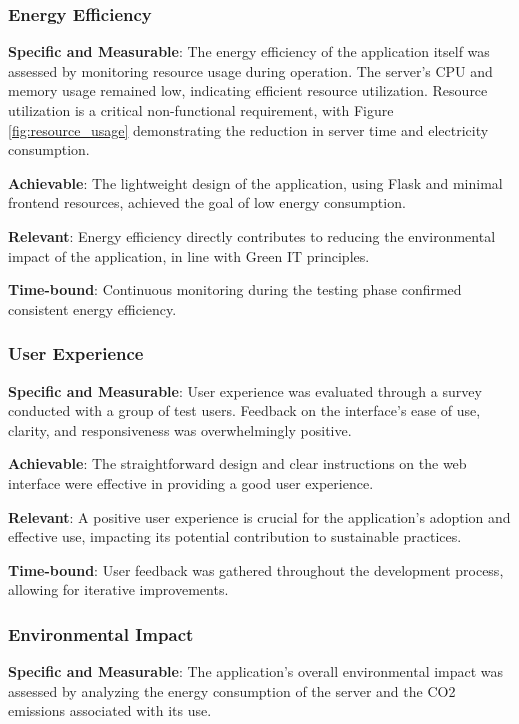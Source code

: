 \documentclass[conference,compsoc]{IEEEtran}
\begin{document}
\subsubsection{Energy Efficiency}
\textbf{Specific and Measurable}: The energy efficiency of the application itself was assessed by monitoring resource usage during operation. The server's CPU and memory usage remained low, indicating efficient resource utilization. Resource utilization is a critical non-functional requirement, with Figure \ref{fig:resource_usage} demonstrating the reduction in server time and electricity consumption.

\textbf{Achievable}: The lightweight design of the application, using Flask and minimal frontend resources, achieved the goal of low energy consumption.

\textbf{Relevant}: Energy efficiency directly contributes to reducing the environmental impact of the application, in line with Green IT principles.

\textbf{Time-bound}: Continuous monitoring during the testing phase confirmed consistent energy efficiency.

\subsubsection{User Experience}
\textbf{Specific and Measurable}: User experience was evaluated through a survey conducted with a group of test users. Feedback on the interface's ease of use, clarity, and responsiveness was overwhelmingly positive.

\textbf{Achievable}: The straightforward design and clear instructions on the web interface were effective in providing a good user experience.

\textbf{Relevant}: A positive user experience is crucial for the application's adoption and effective use, impacting its potential contribution to sustainable practices.

\textbf{Time-bound}: User feedback was gathered throughout the development process, allowing for iterative improvements.

\subsubsection{Environmental Impact}
\textbf{Specific and Measurable}: The application's overall environmental impact was assessed by analyzing the energy consumption of the server and the CO2 emissions associated with its use.
\end{document}
